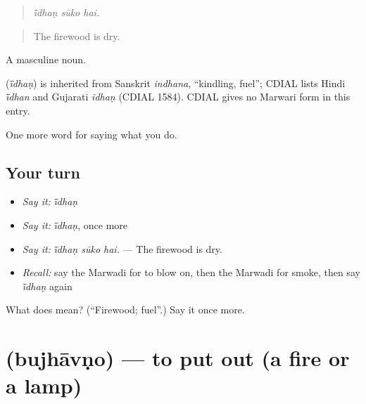\begin{quote}
  
\end{quote}

\begin{quote}
\emph{ī̃dhaṇ sūko hai.}
\end{quote}

\begin{quote}
The firewood is dry.
\end{quote}

A masculine noun.

\begin{cousinweb}
\textbf{} (\emph{ī̃dhaṇ}) is inherited from Sanskrit \emph{indhana}, \textquotedblleft{}kindling, fuel\textquotedblright{}; CDIAL lists Hindi \emph{ī̃dhan} and Gujarati \emph{ĩdhaṇ} (CDIAL 1584). CDIAL gives no Marwari form in this entry.
\end{cousinweb}

\begin{grammarlens}[title={What you've built}]
One more word for saying what you do.
\end{grammarlens}

\subsection*{Your turn}
\begin{itemize}
\raggedright
  \item \emph{Say it:} \emph{ī̃dhaṇ}
  \item \emph{Say it:} \emph{ī̃dhaṇ}, once more
  \item \emph{Say it:} \emph{ī̃dhaṇ sūko hai.} — The firewood is dry.
  \item \emph{Recall:} say the Marwadi for to blow on, then the Marwadi for smoke, then say \emph{ī̃dhaṇ} again
\end{itemize}

\begin{tcolorbox}[breakable,colback=teal!4,colframe=teal!35!black,title={Before you move on}]
What does  mean? (\textquotedblleft{}Firewood; fuel\textquotedblright{}.) Say it once more.
\end{tcolorbox}
\section[\texorpdfstring{\mw{बुझावणो} (bujhāvṇo)}{बुझावणो (bujhāvṇo)}]{ (bujhāvṇo) — to put out (a fire or a lamp)}

\label{lesson:MW-C173-bujhavno}



